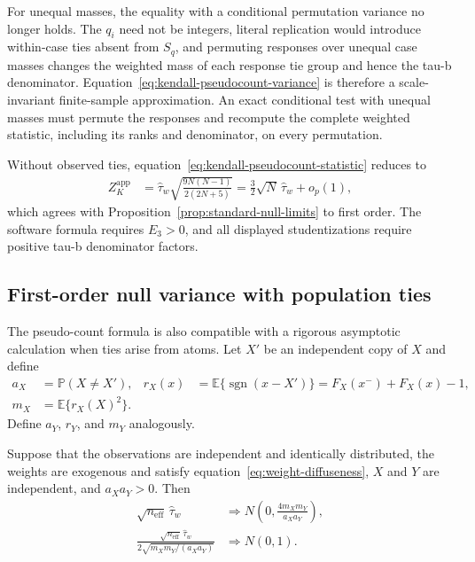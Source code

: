 For unequal masses, the equality with a conditional permutation variance no
longer holds. The $q_i$ need not be integers, literal replication would
introduce within-case ties absent from $S_q$, and permuting responses over
unequal case masses changes the weighted mass of each response tie group and
hence the tau-b denominator. Equation~\eqref{eq:kendall-pseudocount-variance}
is therefore a scale-invariant finite-sample approximation. An exact
conditional test with unequal masses must permute the responses and recompute
the complete weighted statistic, including its ranks and denominator, on
every permutation.

Without observed ties, equation~\eqref{eq:kendall-pseudocount-statistic}
reduces to
\begin{align*}
 Z_K^{\mathrm{app}}
 &=\widehat\tau_w
 \sqrt{\frac{9N(N-1)}{2(2N+5)}}
 =\frac{3}{2}\sqrt N\,\widehat\tau_w+o_p(1),
\end{align*}
which agrees with Proposition~\ref{prop:standard-null-limits} to first order.
The software formula requires $E_3>0$, and all displayed studentizations
require positive tau-b denominator factors.

\subsection{First-order null variance with population ties}

The pseudo-count formula is also compatible with a rigorous asymptotic
calculation when ties arise from atoms. Let $X'$ be an independent copy of
$X$ and define
\begin{align*}
 a_X
 &=\mathbb P(X\neq X'),
 &
 r_X(x)
 &=\mathbb E\{\operatorname{sgn}(x-X')\}
 =F_X(x^-)+F_X(x)-1,\\
 m_X
 &=\mathbb E\{r_X(X)^2\}.
\end{align*}
Define $a_Y$, $r_Y$, and $m_Y$ analogously.

\begin{proposition}
\label{prop:kendall-population-ties}
Suppose that the observations are independent and identically distributed,
the weights are exogenous and satisfy
equation~\eqref{eq:weight-diffuseness}, $X$ and $Y$ are independent, and
$a_Xa_Y>0$. Then
\begin{align*}
 \sqrt{n_{\mathrm{eff}}}\,\widehat\tau_w
 &\mathrel{\Longrightarrow}
 N\!\left(0,\frac{4m_Xm_Y}{a_Xa_Y}\right),\\
 \frac{\sqrt{n_{\mathrm{eff}}}\,\widehat\tau_w}
 {2\sqrt{m_Xm_Y/(a_Xa_Y)}}
 &\mathrel{\Longrightarrow}N(0,1).
\end{align*}
\end{proposition}

